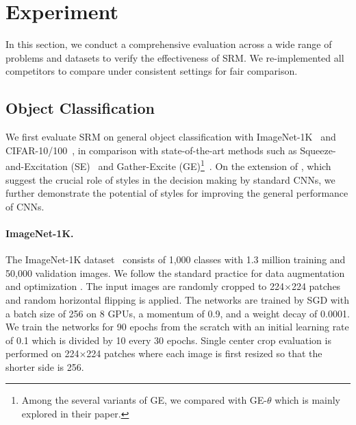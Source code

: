 \section{Experiment} \label{experiment}

In this section, we conduct a comprehensive evaluation across a wide range of problems and datasets to verify the effectiveness of SRM.
We re-implemented all competitors to compare under consistent settings for fair comparison. 

\subsection{Object Classification} \label{image_classification}

We first evaluate SRM on general object classification with ImageNet-1K~\cite{russakovsky2015imagenet} and CIFAR-10/100~\cite{krizhevsky2009learning}, in comparison with state-of-the-art methods such as Squeeze-and-Excitation (SE)~\cite{hu2018squeeze} and Gather-Excite (GE)\footnote{Among the several variants of GE, we compared with GE-$\theta$ which is mainly explored in their paper.}~\cite{hu2018gather}.
On the extension of \cite{brendel2019approximating,geirhos2019imagenet}, which suggest the crucial role of styles in the decision making by standard CNNs, we further demonstrate the potential of styles for improving the general performance of CNNs.

\paragraph{ImageNet-1K.}
The ImageNet-1K dataset~\cite{russakovsky2015imagenet} consists of 1,000 classes with 1.3 million training and 50,000 validation images.
We follow the standard practice for data augmentation and optimization \cite{he2016deep}.
The input images are randomly cropped to  224$\times$224 patches and random horizontal flipping is applied.
The networks are trained by SGD with a batch size of 256 on 8 GPUs, a momentum of 0.9, and a weight decay of 0.0001.
We train the networks for 90 epochs from the scratch with an initial learning rate of 0.1 which is divided by 10 every 30 epochs.
Single center crop evaluation is performed on 224$\times$224 patches where each image is first resized so that the shorter side is 256. 

